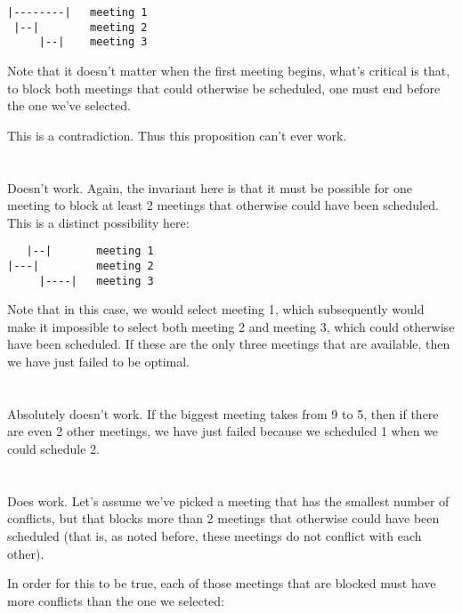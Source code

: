 \documentclass[a4paper]{article}
\begin{document}
\begin{verbatim}
|--------|   meeting 1
 |--|        meeting 2
     |--|    meeting 3
\end{verbatim}

Note that it doesn't matter when the first meeting begins, what's critical is that, to block both meetings that could otherwise be scheduled, one must end before the one we've selected.

This is a contradiction. Thus this proposition can't ever work.

\section{}

Doesn't work. Again, the invariant here is that it must be possible for one meeting to block at least 2 meetings that otherwise could have been scheduled. This is a distinct possibility here:

\begin{verbatim}
   |--|       meeting 1
|---|         meeting 2
     |----|   meeting 3
\end{verbatim}

Note that in this case, we would select meeting 1, which subsequently would make it impossible to select both meeting 2 and meeting 3, which could otherwise have been scheduled. If these are the only three meetings that are available, then we have just failed to be optimal.

\section{}

Absolutely doesn't work. If the biggest meeting takes from 9 to 5, then if there are even 2 other meetings, we have just failed because we scheduled 1 when we could schedule 2.

\section{}

Does work. Let's assume we've picked a meeting that has the smallest number of conflicts, but that blocks more than 2 meetings that otherwise could have been scheduled (that is, as noted before, these meetings do not conflict with each other).

In order for this to be true, each of those meetings that are blocked must have more conflicts than the one we selected:
\end{document}
